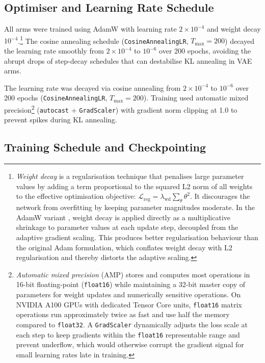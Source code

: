 \documentclass[12pt, a4paper, twoside, openright]{book}
\begin{document}
\subsection{Optimiser and Learning Rate Schedule}
\label{sec:methods:training:optimiser}

All arms were trained using AdamW \cite{loshchilov_decoupled_2019} with learning rate $2\times10^{-4}$ and weight decay $10^{-4}$.\footnote{\emph{Weight decay} is a regularisation technique that penalises large parameter values by adding a term proportional to the squared L2 norm of all weights to the effective optimisation objective: $\mathcal{L}_{\mathrm{reg}} = \lambda_{\mathrm{wd}}\sum_\theta \theta^2$. It discourages the network from overfitting by keeping parameter magnitudes moderate. In the AdamW variant \cite{loshchilov_decoupled_2019}, weight decay is applied directly as a multiplicative shrinkage to parameter values at each update step, decoupled from the adaptive gradient scaling. This produces better regularisation behaviour than the original Adam formulation, which conflates weight decay with L2 regularisation and thereby distorts the adaptive scaling.} The cosine annealing schedule (\texttt{CosineAnnealingLR}, $T_{\max}=200$) decayed the learning rate smoothly from $2\times10^{-4}$ to $10^{-6}$ over 200 epochs, avoiding the abrupt drops of step-decay schedules that can destabilise KL annealing in VAE arms.

The learning rate was decayed via cosine annealing from $2\times10^{-4}$ to $10^{-6}$ over 200 epochs (\texttt{CosineAnnealingLR}, $T_{\max}=200$). Training used automatic mixed precision\footnote{\emph{Automatic mixed precision} (AMP) \cite{micikevicius_mixed_2018} stores and computes most operations in 16-bit floating-point (\texttt{float16}) while maintaining a 32-bit master copy of parameters for weight updates and numerically sensitive operations. On NVIDIA A100 GPUs with dedicated Tensor Core units, \texttt{float16} matrix operations run approximately twice as fast and use half the memory compared to \texttt{float32}. A \texttt{GradScaler} dynamically adjusts the loss scale at each step to keep gradients within the \texttt{float16} representable range and prevent underflow, which would otherwise corrupt the gradient signal for small learning rates late in training.} (\texttt{autocast} + \texttt{GradScaler}) with gradient norm clipping at 1.0 to prevent spikes during KL annealing.

\subsection{Training Schedule and Checkpointing}
\label{sec:methods:training:schedule}
\end{document}
